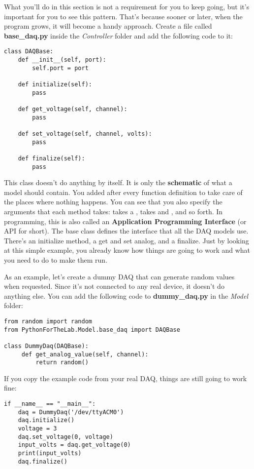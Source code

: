 What you'll do in this section is not a requirement for you to keep going, but it's important for you to see this pattern. That's because sooner or later, when the program grows, it will become a handy approach. Create a file called \textbf{base\_daq.py} inside the \emph{Controller} folder and add the following code to it:

\begin{verbatim}
class DAQBase:
    def __init__(self, port):
        self.port = port

    def initialize(self):
        pass

    def get_voltage(self, channel):
        pass

    def set_voltage(self, channel, volts):
        pass

    def finalize(self):
        pass
\end{verbatim}

This class doesn't do anything by itself. It is only the \textbf{schematic} of what a model should contain. You added  after every function definition to take care of the places where nothing happens. You can see that you also specify the arguments that each method takes:  takes a ,  takes  and , and so forth. In programming, this is also called an \textbf{Application Programming Interface} (or API for short). The base class defines the interface that all the DAQ models use. There's an initialize method, a get and set analog, and a finalize. Just by looking at this simple example, you already know how things are going to work and what you need to do to make them run.

As an example, let's create a dummy DAQ that can generate random values when requested. Since it's not connected to any real device, it doesn't do anything else. You can add the following code to \textbf{dummy\_daq.py} in the \emph{Model} folder:

\begin{verbatim}
from random import random
from PythonForTheLab.Model.base_daq import DAQBase

class DummyDaq(DAQBase):
     def get_analog_value(self, channel):
         return random()
\end{verbatim}

If you copy the example code from your real DAQ, things are still going to work fine:

\begin{verbatim}
if __name__ == "__main__":
    daq = DummyDaq('/dev/ttyACM0')
    daq.initialize()
    voltage = 3
    daq.set_voltage(0, voltage)
    input_volts = daq.get_voltage(0)
    print(input_volts)
    daq.finalize()
\end{verbatim}

